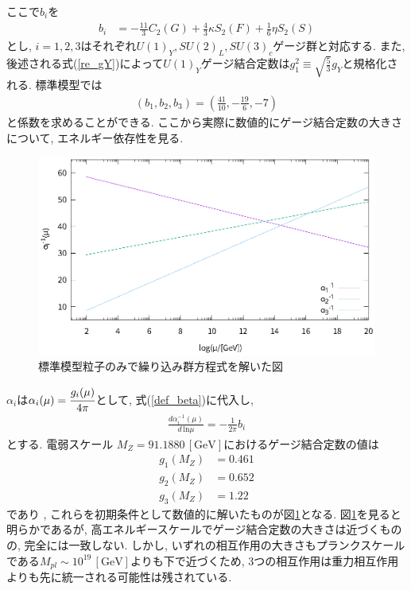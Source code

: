 ここで$b_i$を
\begin{align}
  b_i &= -\frac{11}{3}C_2(G) +\frac{4}{3}\kappa S_2(F) + \frac{1}{6}\eta S_2(S)\nonumber
\end{align}
とし, $i=1,2,3$はそれぞれ$U(1)_Y, SU(2)_L, SU(3)_c$ゲージ群と対応する.
また, 後述される式(\ref{re_gY})によって$U(1)_Y$ゲージ結合定数は$g_1^2\equiv \sqrt{\frac{5}{3}}g_Y$と規格化される.
標準模型では
\begin{align}
  \left(b_1, b_2, b_3 \right) = \left( \frac{41}{10}, -\frac{19}{6}, -7\right)\nonumber
\end{align}
と係数を求めることができる.
ここから実際に数値的にゲージ結合定数の大きさについて, エネルギー依存性を見る.
\begin{figure}[ht]
  \centering
  \includegraphics[width=12truecm,clip]{fig/RGE_SM.eps}
  \caption{標準模型粒子のみで繰り込み群方程式を解いた図}
  \label{fig:RGE_SM}
\end{figure}
$\alpha_i$は$\alpha_i(\mu) = \cfrac{g_i(\mu)}{4\pi}$として, 式(\ref{def_beta})に代入し, 
\begin{align}
  \frac{d \alpha_i^{-1}(\mu)}{d\,\mathrm{ln}{\mu}} = -\frac{1}{2\pi}b_i
\end{align}
とする.
電弱スケール $M_Z=91.1880\,[\mathrm{GeV}]$におけるゲージ結合定数の値は
\begin{align}
  g_1(M_Z) &= 0.461\nonumber\\
  g_2(M_Z) &= 0.652\nonumber\\
  g_3(M_Z) &= 1.22\nonumber
\end{align}
であり
\cite{navasReviewParticlePhysics2024}, これらを初期条件として数値的に解いたものが図\ref{fig:RGE_SM}となる.
図\ref{fig:RGE_SM}を見ると明らかであるが, 高エネルギースケールでゲージ結合定数の大きさは近づくものの, 完全には一致しない.
しかし, いずれの相互作用の大きさもプランクスケールである$M_{pl}\sim 10^{19}\,[\mathrm{GeV}]$よりも下で近づくため, 3つの相互作用は重力相互作用よりも先に統一される可能性は残されている.

